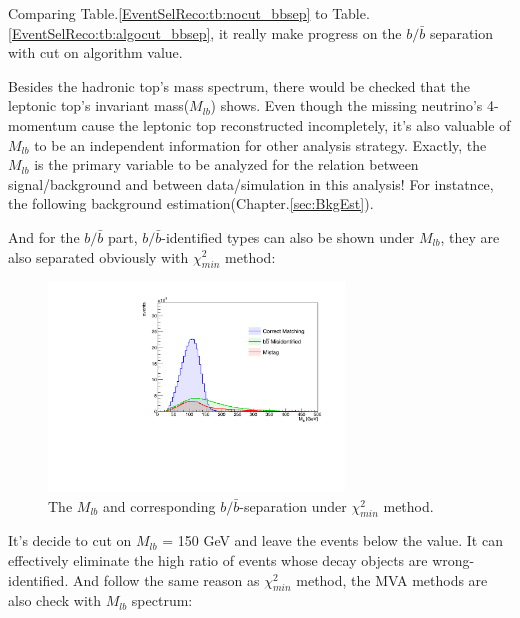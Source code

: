 		Comparing Table.\ref{EventSelReco:tb:nocut_bbsep} to Table.\ref{EventSelReco:tb:algocut_bbsep}, it really make progress on the $b/\bar{b}$ separation with cut on algorithm value. 

		Besides the hadronic top's mass spectrum, there would be checked that the leptonic top's invariant mass($M_{lb}$) shows. Even though the missing neutrino's 4-momentum cause the leptonic top reconstructed incompletely, it's also valuable of $M_{lb}$ to be an independent information for other analysis strategy. Exactly, the $M_{lb}$ is the primary variable to be analyzed for the relation between signal/background and between data/simulation in this analysis! For instatnce, the following background estimation(Chapter.\ref{sec:BkgEst}).

		And for the $b/\bar{b}$ part, $b/\bar{b}$-identified types can also be shown under $M_{lb}$, they are also separated obviously with $\chi^2_{min}$ method:

		\begin{figure}[H]
		\centering
			\includegraphics[width=0.7\textwidth]{Figures/EventSelReco/bbsep/chi2_bbsep_leptop_t.pdf}
		\caption{The $M_{lb}$ and corresponding $b/\bar{b}$-separation under $\chi^2_{min}$ method.}
		\label{EventSelReco:fig:chi2_bbsep_leptop}
		\end{figure}
		\FloatBarrier

		It's decide to cut on $M_{lb}$ = 150 GeV and leave the events below the value. It can effectively eliminate the high ratio of events whose decay objects are wrong-identified. And follow the same reason as $\chi^2_{min}$ method, the MVA methods are also check with $M_{lb}$ spectrum:

